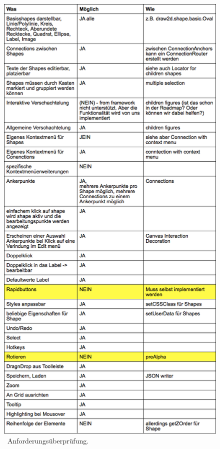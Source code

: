 \begin{figure}[h!]
  \includegraphics[height=0.9\textheight]{Figures/DD_Anforderungen.png}
  \caption{\dd~Anforderungsüberprüfung.}\label{fig.ddCheck}
\end{figure}


